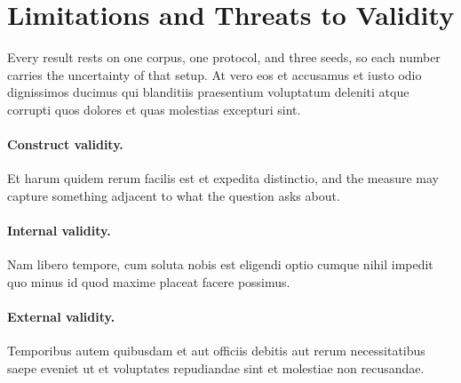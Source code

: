 \section{Limitations and Threats to Validity}
\label{sec:limitations}

Every result rests on one corpus, one protocol, and three seeds, so each number carries the uncertainty of that setup.
At vero eos et accusamus et iusto odio dignissimos ducimus qui blanditiis praesentium voluptatum deleniti atque corrupti quos dolores et quas molestias excepturi sint.

\paragraph{Construct validity.}
Et harum quidem rerum facilis est et expedita distinctio, and the measure may capture something adjacent to what the question asks about.

\paragraph{Internal validity.}
Nam libero tempore, cum soluta nobis est eligendi optio cumque nihil impedit quo minus id quod maxime placeat facere possimus.

\paragraph{External validity.}
Temporibus autem quibusdam et aut officiis debitis aut rerum necessitatibus saepe eveniet ut et voluptates repudiandae sint et molestiae non recusandae.
